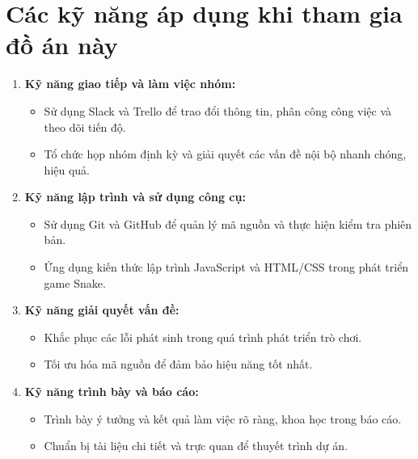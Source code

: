 \documentclass[a4paper, 12pt]{article}
\begin{document}
\section{Các kỹ năng áp dụng khi tham gia đồ án này}
\begin{enumerate}
    \item \textbf{Kỹ năng giao tiếp và làm việc nhóm:}
    \begin{itemize}
        \item Sử dụng Slack và Trello để trao đổi thông tin, phân công công việc và theo dõi tiến độ.
        \item Tổ chức họp nhóm định kỳ và giải quyết các vấn đề nội bộ nhanh chóng, hiệu quả.
    \end{itemize}
    
    \item \textbf{Kỹ năng lập trình và sử dụng công cụ:}
    \begin{itemize}
        \item Sử dụng Git và GitHub để quản lý mã nguồn và thực hiện kiểm tra phiên bản.
        \item Ứng dụng kiến thức lập trình JavaScript và HTML/CSS trong phát triển game Snake.
    \end{itemize}
    
    \item \textbf{Kỹ năng giải quyết vấn đề:}
    \begin{itemize}
        \item Khắc phục các lỗi phát sinh trong quá trình phát triển trò chơi.
        \item Tối ưu hóa mã nguồn để đảm bảo hiệu năng tốt nhất.
    \end{itemize}
    
    \item \textbf{Kỹ năng trình bày và báo cáo:}
    \begin{itemize}
        \item Trình bày ý tưởng và kết quả làm việc rõ ràng, khoa học trong báo cáo.
        \item Chuẩn bị tài liệu chi tiết và trực quan để thuyết trình dự án.
    \end{itemize}
\end{enumerate}

\end{document}
